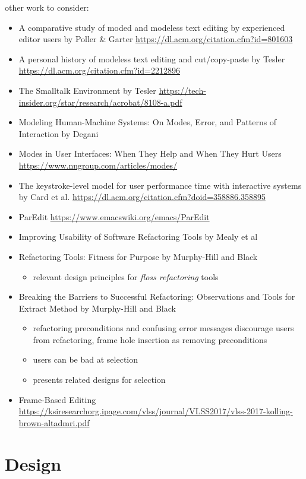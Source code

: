 \documentclass[runningheads]{llncs}
\begin{document}
other work to consider:
\begin{itemize}
\item A comparative study of moded and modeless text editing by experienced editor users by Poller \& Garter \url{https://dl.acm.org/citation.cfm?id=801603}
\item A personal history of modeless text editing and cut/copy-paste by Tesler \url{https://dl.acm.org/citation.cfm?id=2212896}
\item The Smalltalk Environment by Tesler \url{https://tech-insider.org/star/research/acrobat/8108-a.pdf}
\item Modeling Human-Machine Systems: On Modes, Error, and Patterns of Interaction by Degani %
\item Modes in User Interfaces: When They Help and When They Hurt Users \url{https://www.nngroup.com/articles/modes/}
\item The keystroke-level model for user performance time with interactive systems by Card et al. \url{https://dl.acm.org/citation.cfm?doid=358886.358895}
\item ParEdit \url{https://www.emacswiki.org/emacs/ParEdit}
\item Improving Usability of Software Refactoring Tools by Mealy et al
\item Refactoring Tools: Fitness for Purpose by Murphy-Hill and Black
	\begin{itemize}
		\item relevant design principles for \emph{floss refactoring} tools
	\end{itemize}
\item Breaking the Barriers to Successful Refactoring: Observations and Tools for Extract Method by Murphy-Hill and Black
	\begin{itemize}
		\item refactoring preconditions and confusing error messages discourage users from refactoring, frame hole insertion as removing preconditions
		\item users can be bad at selection
		\item presents related designs for selection
	\end{itemize}
\item Frame-Based Editing \url{https://ksiresearchorg.ipage.com/vlss/journal/VLSS2017/vlss-2017-kolling-brown-altadmri.pdf}
\end{itemize}


\section{Design} \label{sec:design}
\end{document}
